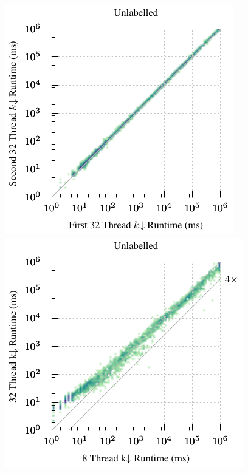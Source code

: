 \documentclass{llncs}
\begin{document}
\begin{figure}[p]
    \vspace*{1em}
    \centering
    \hspace*{1em}\includegraphics*[scale=0.7]{plots/plain-kdown-par-repeat-heatmap.pdf}\hfill
    \includegraphics*[scale=0.7]{plots/plain-kdown-par-8to32-heatmap.pdf}\hspace*{1em}


\end{figure}
\end{document}
